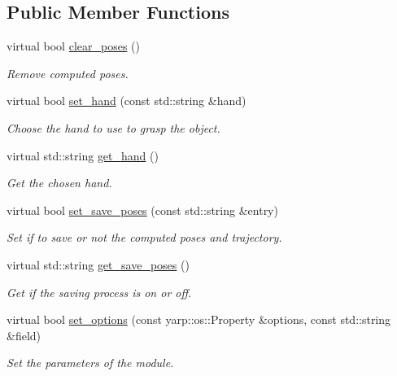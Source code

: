 \subsection*{Public Member Functions}
\begin{DoxyCompactItemize}
\item 
virtual bool \hyperlink{classsuperquadricGrasp__IDL_a6d1e4533ad8b34510ba9792f7cd72113}{clear\+\_\+poses} ()
\begin{DoxyCompactList}\small\item\em Remove computed poses. \end{DoxyCompactList}\item 
virtual bool \hyperlink{classsuperquadricGrasp__IDL_a6215b75f080a5837599b25826c142921}{set\+\_\+hand} (const std\+::string \&hand)
\begin{DoxyCompactList}\small\item\em Choose the hand to use to grasp the object. \end{DoxyCompactList}\item 
virtual std\+::string \hyperlink{classsuperquadricGrasp__IDL_ad1e5b402e403bc6765d7bf7e8fff0e91}{get\+\_\+hand} ()
\begin{DoxyCompactList}\small\item\em Get the chosen hand. \end{DoxyCompactList}\item 
virtual bool \hyperlink{classsuperquadricGrasp__IDL_ac01ec2012d2b12098a86f7f053068464}{set\+\_\+save\+\_\+poses} (const std\+::string \&entry)
\begin{DoxyCompactList}\small\item\em Set if to save or not the computed poses and trajectory. \end{DoxyCompactList}\item 
virtual std\+::string \hyperlink{classsuperquadricGrasp__IDL_aab45b0423b4e2d440b8a1256c1d6bdfc}{get\+\_\+save\+\_\+poses} ()
\begin{DoxyCompactList}\small\item\em Get if the saving process is on or off. \end{DoxyCompactList}\item 
virtual bool \hyperlink{classsuperquadricGrasp__IDL_a5320ef56cf3da687e7cf678b2a9397f5}{set\+\_\+options} (const yarp\+::os\+::\+Property \&options, const std\+::string \&field)
\begin{DoxyCompactList}\small\item\em Set the parameters of the module. \end{DoxyCompactList}\item 

\end{DoxyCompactItemize}
